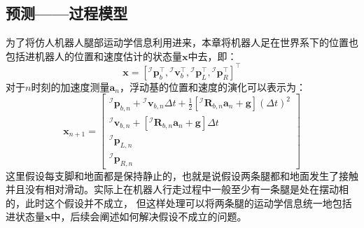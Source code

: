 
\subsection{预测——过程模型}

为了将仿人机器人腿部运动学信息利用进来，本章将机器人足在世界系下的位置也包括进机器人的位置和速度估计的状态量$\boldsymbol{x}$中去，即：
\begin{equation}
    \label{equ:est_posvel}
    \boldsymbol{x}=\left[{ }^\mathcal{I} \boldsymbol{p}_b^{\top},{ }^\mathcal{I} \boldsymbol{v}_b^{\top},{ }^\mathcal{I} \boldsymbol{p}_L^{\top},{ }^\mathcal{I} \boldsymbol{p}_R^{\top}\right]^{\top}
\end{equation}
对于$n$时刻的加速度测量$\boldsymbol{a}_n$，浮动基的位置和速度的演化可以表示为：
\begin{equation}
    \label{equ:est_posvel}
    \boldsymbol{x}_{n+1}=\left[\begin{array}{c}
        { }^{\mathcal{I}} \boldsymbol{p}_{b, n}+{ }^{\mathcal{I}} \boldsymbol{v}_{b, n} \Delta t+\frac{1}{2}\left[{ }^{\mathcal{I}} \boldsymbol{R}_{b, n} \boldsymbol{a}_n+\boldsymbol{g}\right](\Delta t)^2 \\
        { }^{\mathcal{I}} \boldsymbol{v}_{b, n}+\left[{ }^{\mathcal{I}} \boldsymbol{R}_{b, n} \boldsymbol{a}_n+\boldsymbol{g}\right] \Delta t \\
        { }^{\mathcal{I}} \boldsymbol{p}_{L, n} \\
        { }^{\mathcal{I}} \boldsymbol{p}_{R, n}
        \end{array}\right]
\end{equation}
这里假设每支脚和地面都是保持静止的，也就是说假设两条腿都和地面发生了接触并且没有相对滑动。实际上在机器人行走过程中一般至少有一条腿是处在摆动相的，此时这个假设并不成立，
但这样处理可以将两条腿的运动学信息统一地包括进状态量$\boldsymbol{x}$中，后续会阐述如何解决假设不成立的问题。

